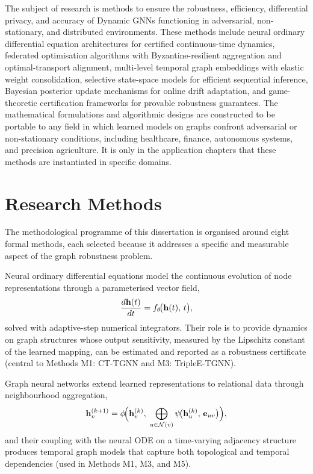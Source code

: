 The subject of research is methods to ensure the robustness, efficiency, differential privacy, and accuracy of Dynamic GNNs functioning in adversarial, non-stationary, and distributed environments. These methods include neural ordinary differential equation architectures for certified continuous-time dynamics, federated optimisation algorithms with Byzantine-resilient aggregation and optimal-transport alignment, multi-level temporal graph embeddings with elastic weight consolidation, selective state-space models for efficient sequential inference, Bayesian posterior update mechanisms for online drift adaptation, and game-theoretic certification frameworks for provable robustness guarantees. The mathematical formulations and algorithmic designs are constructed to be portable to any field in which learned models on graphs confront adversarial or non-stationary conditions, including healthcare, finance, autonomous systems, and precision agriculture. It is only in the application chapters that these methods are instantiated in specific domains.


\section*{Research Methods}

The methodological programme of this dissertation is organised around eight formal methods, each selected because it addresses a specific and measurable aspect of the graph robustness problem.

Neural ordinary differential equations model the continuous evolution of node representations through a parameterised vector field,
\begin{equation}
\frac{d\mathbf{h}(t)}{dt} = f_\theta\!\bigl(\mathbf{h}(t),\, t\bigr),
\label{eq:node}
\end{equation}
solved with adaptive-step numerical integrators. Their role is to provide dynamics on graph structures whose output sensitivity, measured by the Lipschitz constant of the learned mapping, can be estimated and reported as a robustness certificate (central to Methods M1: CT-TGNN and M3: TripleE-TGNN).

Graph neural networks extend learned representations to relational data through neighbourhood aggregation,
\begin{equation}
\mathbf{h}_v^{(k+1)}
= \phi\!\Bigl(\mathbf{h}_v^{(k)},\;
  \bigoplus_{u\in\mathcal{N}(v)}
    \psi\!\bigl(\mathbf{h}_u^{(k)},\, \mathbf{e}_{uv}\bigr)\Bigr),
\label{eq:gnn_mp}
\end{equation}
and their coupling with the neural ODE on a time-varying adjacency structure produces temporal graph models that capture both topological and temporal dependencies (used in Methods M1, M3, and M5).

